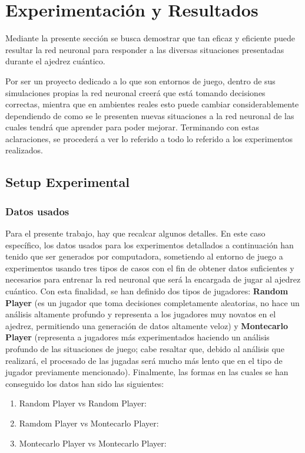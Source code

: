 \section{Experimentación y Resultados}

Mediante la presente sección se busca demostrar que tan eficaz y eficiente puede resultar la red neuronal para responder a las diversas situaciones presentadas durante el ajedrez cuántico.

Por ser un proyecto dedicado a lo que son entornos de juego, dentro de sus simulaciones propias la red neuronal creerá que está tomando decisiones correctas, mientra que en ambientes reales esto puede cambiar considerablemente dependiendo de como se le presenten nuevas situaciones a la red neuronal de las cuales tendrá que aprender para poder mejorar. Terminando con estas aclaraciones, se procederá a ver lo referido a todo lo referido a los experimentos realizados.

\subsection{Setup Experimental}
\subsubsection{Datos usados}

Para el presente trabajo, hay que recalcar algunos detalles. En este caso específico, los datos usados para los experimentos detallados a continuación han tenido que ser generados por computadora, sometiendo al entorno de juego a experimentos usando tres tipos de casos con el fin de obtener datos suficientes y necesarios para entrenar la red neuronal que será la encargada de jugar al ajedrez cuántico. Con esta finalidad, se han definido dos tipos de jugadores: \textbf{Random Player} (es un jugador que toma decisiones completamente aleatorias, no hace un análisis altamente profundo y representa a los jugadores muy novatos en el ajedrez, permitiendo una generación de datos altamente veloz) y \textbf{Montecarlo Player} (representa a jugadores más experimentados haciendo un análisis profundo de las situaciones de juego; cabe resaltar que, debido al análisis que realizará, el procesado de las jugadas será mucho más lento que en el tipo de jugador previamente mencionado). Finalmente, las formas en las cuales se han conseguido los datos han sido las siguientes:

\begin{enumerate}
    \item Random Player vs Random Player: 
    \item Ramdom Player vs Montecarlo Player:
    \item Montecarlo Player vs Montecarlo Player: 
\end{enumerate}

